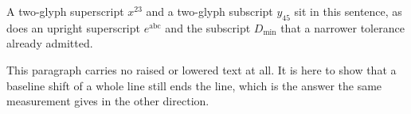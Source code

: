 \documentclass{article}
\begin{document}
A two-glyph superscript $x^{23}$ and a two-glyph subscript $y_{45}$ sit in this sentence, as
does an upright superscript $e^{\mathrm{abc}}$ and the subscript $D_{\mathrm{min}}$ that a
narrower tolerance already admitted.

\bigskip

\noindent This paragraph carries no raised or lowered text at all. It is here to show that a
baseline shift of a whole line still ends the line, which is the answer the same measurement
gives in the other direction.
\end{document}
